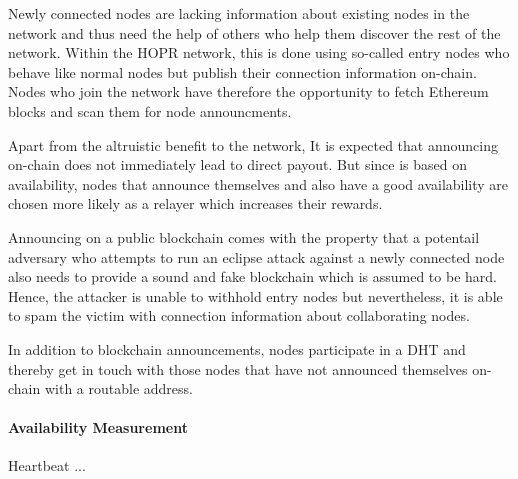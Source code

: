 Newly connected nodes are lacking information about existing nodes in the network and thus need the help of others who help them discover the rest of the network. Within the HOPR network, this is done using so-called entry nodes who behave like normal nodes but publish their connection information on-chain. Nodes who join the network have therefore the opportunity to fetch Ethereum blocks and scan them for node announcments.

Apart from the altruistic benefit to the network, It is expected that announcing on-chain does not immediately lead to direct payout. But since  is based on availability, nodes that announce themselves and also have a good availability are chosen more likely as a relayer which increases their rewards.

Announcing on a public blockchain comes with the property that a potentail adversary who attempts to run an eclipse attack against a newly connected node also needs to provide a sound and fake blockchain which is assumed to be hard. Hence, the attacker is unable to withhold entry nodes but nevertheless, it is able to spam the victim with connection information about collaborating nodes.

In addition to blockchain announcements, nodes participate in a DHT and thereby get in touch with those nodes that have not announced themselves on-chain with a routable address.

\paragraph{Availability Measurement}

Heartbeat ...